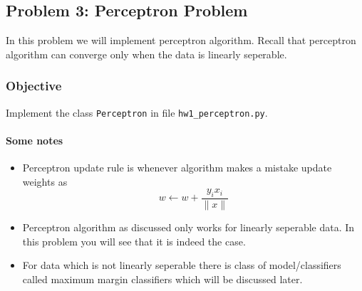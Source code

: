 \documentclass[11pt]{article}
\providecommand{\tightlist}{%
      \setlength{\itemsep}{0pt}\setlength{\parskip}{0pt}}
\begin{document}
    \subsection{Problem 3: Perceptron
Problem}\label{problem-3-perceptron-problem}

In this problem we will implement perceptron algorithm. Recall that
perceptron algorithm can converge only when the data is linearly
seperable.

\subsubsection{Objective}\label{objective}

Implement the class \texttt{Perceptron} in file
\texttt{hw1\_perceptron.py}.

\paragraph{Some notes}\label{some-notes}

\begin{itemize}
\tightlist
\item
  Perceptron update rule is whenever algorithm makes a mistake update
  weights as \[w ← w + \frac{y_i x_i}{\|x\|}\]
\item
  Perceptron algorithm as discussed only works for linearly seperable
  data. In this problem you will see that it is indeed the case.
\item
  For data which is not linearly seperable there is class of
  model/classifiers called maximum margin classifiers which will be
  discussed later.
\end{itemize}
\end{document}

